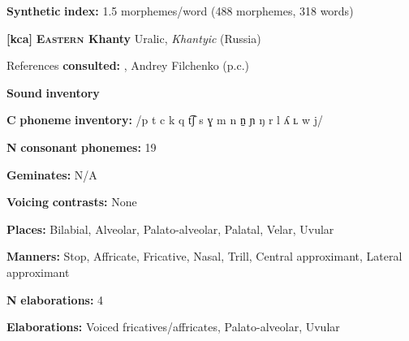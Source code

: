 \begin{styleBody}
\textbf{Synthetic} \textbf{index:} 1.5 morphemes/word (488 morphemes, 318 words)
\end{styleBody}

\begin{styleBody}
\textbf{[kca]}   \textbf{\textsc{Eastern} \textbf{Khanty}}  Uralic, \textit{Khantyic} (Russia)
\end{styleBody}

\begin{styleBody}
References \textbf{consulted:} \citet{Filchenko2007}, Andrey Filchenko (p.c.)
\end{styleBody}

\begin{styleBody}
\textbf{Sound} \textbf{inventory}
\end{styleBody}

\begin{styleBody}
\textbf{C} \textbf{phoneme} \textbf{inventory:} /p t c k q t͡ʃ s ɣ m n n̠ ɲ ŋ r l ʎ ʟ w j/
\end{styleBody}

\begin{styleBody}
\textbf{N} \textbf{consonant} \textbf{phonemes:} 19
\end{styleBody}

\begin{styleBody}
\textbf{Geminates:} N/A
\end{styleBody}

\begin{styleBody}
\textbf{Voicing} \textbf{contrasts:} None
\end{styleBody}

\begin{styleBody}
\textbf{Places:} Bilabial, Alveolar, Palato-alveolar, Palatal, Velar, Uvular
\end{styleBody}

\begin{styleBody}
\textbf{Manners:} Stop, Affricate, Fricative, Nasal, Trill, Central approximant, Lateral approximant
\end{styleBody}

\begin{styleBody}
\textbf{N} \textbf{elaborations:} 4
\end{styleBody}

\begin{styleBody}
\textbf{Elaborations:} Voiced fricatives/affricates, Palato-alveolar, Uvular
\end{styleBody}

